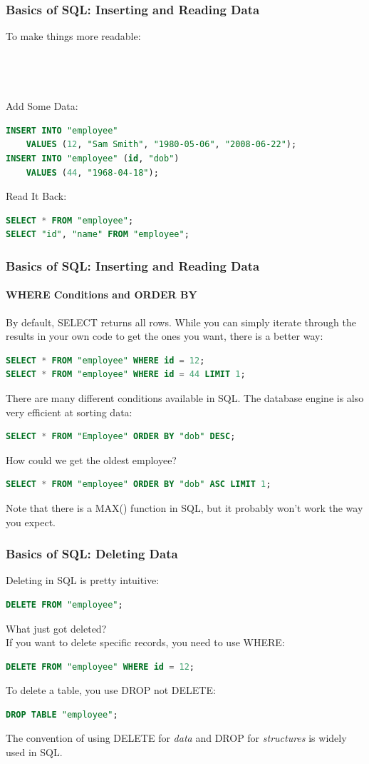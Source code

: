 \documentclass[aspectratio=169]{beamer}
\begin{document}
\begin{frame}[fragile]
    \frametitle{Basics of SQL: Inserting and Reading Data}
    To make things more readable:\\
    \\
    \\
    \\~\\
    Add Some Data:
    \begin{lstlisting}[language=SQL]
INSERT INTO "employee"
    VALUES (12, "Sam Smith", "1980-05-06", "2008-06-22");
INSERT INTO "employee" (id, "dob")
    VALUES (44, "1968-04-18");   
    \end{lstlisting}
    Read It Back:
    \begin{lstlisting}[language=SQL]
SELECT * FROM "employee";
SELECT "id", "name" FROM "employee";
    \end{lstlisting}
\end{frame}
\begin{frame}[fragile]
    \frametitle{Basics of SQL: Inserting and Reading Data}
    \framesubtitle{WHERE Conditions and ORDER BY}
    By default, SELECT returns all rows. \pause While you can simply iterate
    through the results in your own code to get the ones you want, there is a
    better way:
    \begin{lstlisting}[language=SQL]
SELECT * FROM "employee" WHERE id = 12;
SELECT * FROM "employee" WHERE id = 44 LIMIT 1;
    \end{lstlisting}
    There are many different conditions available in SQL.
    \pause
    The database engine is also very efficient at sorting data:
    \begin{lstlisting}[language=SQL]
SELECT * FROM "Employee" ORDER BY "dob" DESC;
    \end{lstlisting}
    How could we get the oldest employee?
    \pause
    \begin{lstlisting}[language=SQL]
SELECT * FROM "employee" ORDER BY "dob" ASC LIMIT 1;
    \end{lstlisting}
    Note that there is a MAX() function in SQL, but it probably won't work the
    way you expect.
\end{frame}
\begin{frame}[fragile]
    \frametitle{Basics of SQL: Deleting Data}
    Deleting in SQL is pretty intuitive:
    \begin{lstlisting}[language=SQL]
DELETE FROM "employee";
    \end{lstlisting}
    What just got deleted?\\
    \pause
    If you want to delete specific records, you need to use WHERE:
    \begin{lstlisting}[language=SQL]
DELETE FROM "employee" WHERE id = 12;
    \end{lstlisting}
    \pause
    To delete a table, you use DROP not DELETE:
    \begin{lstlisting}[language=SQL]
DROP TABLE "employee";
    \end{lstlisting}
    The convention of using DELETE for \emph{data} and DROP for \emph{structures} is widely used in SQL.
\end{frame}
\end{document}
